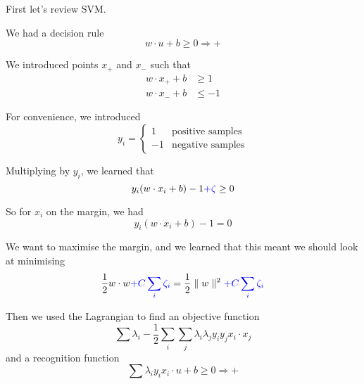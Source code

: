 





First let's review SVM.  

We had a decision rule
\begin{displaymath}
  \boxed{w\cdot u + b \ge 0 \Rightarrow +}
\end{displaymath}

We introduced points $x_+$ and $x_-$ such that
\begin{align*}
  w\cdot x_+ + b & \ge 1
  \\
  w\cdot x_- + b & \le -1
\end{align*}

For convenience, we introduced
\begin{equation*}
  y_i =
  \begin{cases}
    1 & \mbox{positive samples} \\
    -1 & \mbox{negative samples}
  \end{cases}
\end{equation*}

Multiplying by $y_i$, we learned that
\begin{displaymath}
  y_i(w\cdot x_i + b) - 1 \textcolor{blue}{+ \zeta} \ge 0
\end{displaymath}

So for $x_i$ on the margin, we had
\begin{displaymath}
  \boxed{y_i(w\cdot x_i + b) - 1 = 0}
\end{displaymath}

We want to maximise the margin, and we learned that this meant we
should look at minimising
\begin{displaymath}
  \frac 12 w\cdot w \textcolor{blue}{+ C\sum_i \zeta_i}
  = \frac 12 \parallel w \parallel^2 \textcolor{blue}{+ C\sum_i \zeta_i}
\end{displaymath}

Then we used the Lagrangian to find an objective function
\begin{displaymath}
  \sum\lambda_i - \frac 12 \sum_i \sum_j \lambda_i \lambda_j y_i y_j
  x_i\cdot x_j
\end{displaymath}
and a recognition function
\begin{displaymath}
    \sum \lambda_i y_i x_i\cdot u + b \ge 0 \Rightarrow +
\end{displaymath}


